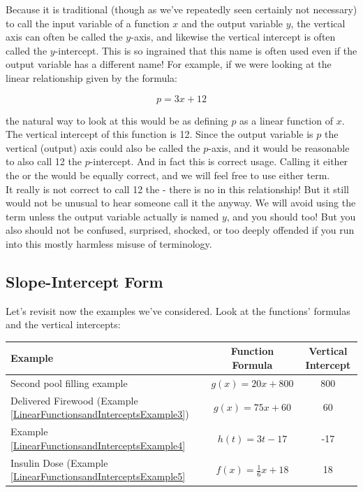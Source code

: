 \bigskip

Because it is traditional (though as we’ve repeatedly seen certainly not necessary) to call the input variable of a function $x$ and the output variable $y$, the vertical axis can often be called the $y$-axis, and likewise the vertical intercept is often called the $y$-intercept. This is so ingrained that this name is often used even if the output variable has a different name! For example, if we were looking at the linear relationship given by the formula:

\begin{equation*}
	p=3x+12
\end{equation*}

the natural way to look at this would be as defining $p$ as a linear function of $x$. The vertical intercept of this function is 12. Since the output variable is $p$ the vertical (output) axis could also be called the $p$-axis, and it would be reasonable to also call 12 the $p$-intercept. And in fact this is correct usage. Calling it either the  or the  would be equally correct, and we will feel free to use either term.\\

It really is not correct to call 12 the  - there is no  in this relationship! But it still would not be unusual to hear someone call it the  anyway. We will avoid using the term  unless the output variable actually is named $y$, and you should too! But you also should not be confused, surprised, shocked, or too deeply offended if you run into this mostly harmless misuse of terminology.

%
%

\subsection{Slope-Intercept Form}

Let’s revisit now the examples we’ve considered. Look at the functions’ formulas and the vertical intercepts:

\begin{center}
	\begin{tabular}{|l|c|c|}
		\hline
		Example & Function Formula & Vertical Intercept\\
		\hline
		Second pool filling example & $g(x)=20x+800$ & 800\\
		\hline
		Delivered Firewood (Example \ref{LinearFunctionsandInterceptsExample3}) & $g(x)=75x+60$ & 60\\
		\hline
		Example \ref{LinearFunctionsandInterceptsExample4} & $h(t)=3t-17$ & -17\\
		\hline
		Insulin Dose (Example \ref{LinearFunctionsandInterceptsExample5} & $f(x)=\frac{1}{6}x+18$ & 18\\
		\hline
	\end{tabular}
\end{center}


